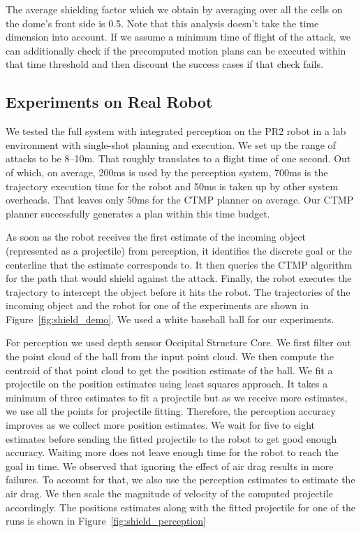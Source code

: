 \documentclass[a4paper]{report}
\begin{document}
The average shielding factor which we obtain by averaging over all the cells on the dome's front side is 0.5. Note that this analysis doesn't take the time dimension into account. If we assume a minimum time of flight of the attack, we can additionally check if the precomputed motion plans can be executed within that time threshold and then discount the success cases if that check fails.

\subsection{Experiments on Real Robot}
We tested the full system with integrated perception on the PR2 robot in a lab environment with single-shot planning and execution.
We set up the range of attacks to be 8--10m. That roughly translates to a flight time of one second. Out of which, on average, 200ms is used by the perception system, 700ms is the trajectory execution time for the robot and 50ms is taken up by other system overheads. That leaves only 50ms for the CTMP planner on average. Our CTMP planner successfully generates a plan within this time budget.

As soon as the robot receives the first estimate of the incoming object (represented as a projectile) from perception, it identifies the discrete goal or the centerline that the estimate corresponds to. It then queries the CTMP algorithm for the path that would shield against the attack. Finally, the robot executes the trajectory to intercept the object before it hits the robot. The trajectories of the incoming object and the robot for one of the experiments are shown in Figure~\ref{fig:shield_demo}. We used a white baseball ball for our experiments.

For perception we used depth sensor Occipital Structure Core. We first filter out the point cloud of the ball from the input point cloud. We then compute the centroid of that point cloud to get the position estimate of the ball. We fit a projectile on the position estimates using least squares approach. It takes a minimum of three estimates to fit a projectile but as we receive more estimates, we use all the points for projectile fitting. Therefore, the perception accuracy improves as we collect more position estimates. We wait for five to eight estimates before sending the fitted projectile to the robot to get good enough accuracy. Waiting more does not leave enough time for the robot to reach the goal in time. We observed that ignoring the effect of air drag results in more failures. To account for that, we also use the perception estimates to estimate the air drag. We then scale the magnitude of velocity of the computed projectile accordingly. The positions estimates along with the fitted projectile for one of the runs is shown in Figure~\ref{fig:shield_perception}
\end{document}
